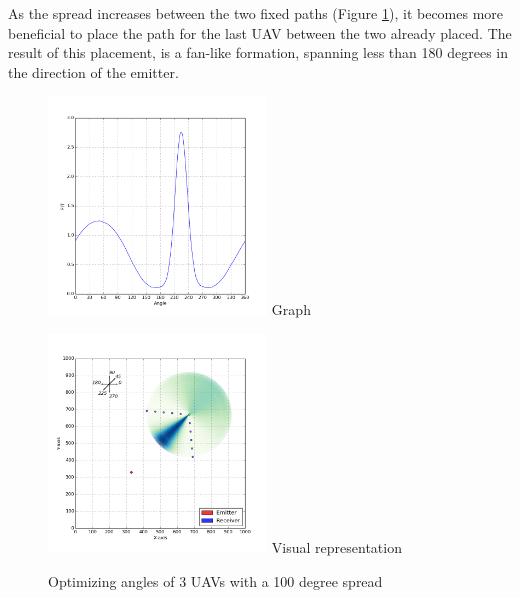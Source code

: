 \documentclass[10pt,a4paper]{book}
\begin{document}
As the spread increases between the two fixed paths (Figure \ref{optangles_100deg_3uavs}), it becomes more beneficial to place the path for the last \gls{UAV} between the two already placed. The result of this placement, is a fan-like formation, spanning less than 180 degrees in the direction of the emitter. 

\begin{figure}[H]
\centering
\begin{minipage}{58mm}
  \centering
  \includegraphics[width=58mm]{optangles/3uavs5steps100deg_1.png}
  Graph
\end{minipage}%
\begin{minipage}{58mm}
  \centering
  \includegraphics[width=58mm]{optangles/3uavs5steps100deg_2.png}
  Visual representation
\end{minipage}
\caption{Optimizing angles of 3 \glspl{UAV} with a 100 degree spread}
\label{optangles_100deg_3uavs}
\end{figure}
\end{document}
